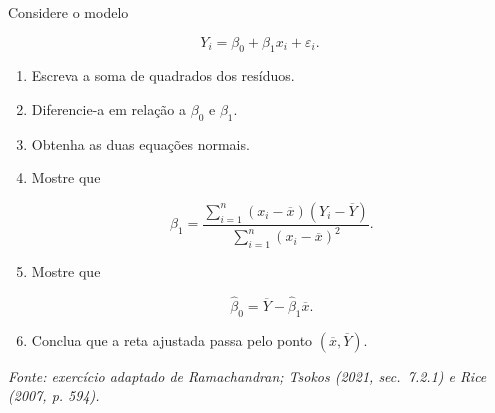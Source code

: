 \documentclass[
  letterpaper,
  DIV=11,
  numbers=noendperiod]{scrreprt}
\begin{document}
\begin{tcolorbox}[enhanced jigsaw, colback=white, leftrule=.75mm, colbacktitle=quarto-callout-tip-color!10!white, breakable, titlerule=0mm, bottomtitle=1mm, title=\textcolor{quarto-callout-tip-color}{\faLightbulb}\hspace{0.5em}{Exercício 1 --- Derivação da reta de mínimos quadrados}, colframe=quarto-callout-tip-color-frame, toprule=.15mm, opacityback=0, bottomrule=.15mm, opacitybacktitle=0.6, arc=.35mm, toptitle=1mm, rightrule=.15mm, coltitle=black, left=2mm]

Considere o modelo

\[Y_i
=
\beta_0+\beta_1x_i+\varepsilon_i.\]

\begin{enumerate}
\def\labelenumi{\arabic{enumi}.}
\item
  Escreva a soma de quadrados dos resíduos.
\item
  Diferencie-a em relação a \(\beta_0\) e \(\beta_1\).
\item
  Obtenha as duas equações normais.
\item
  Mostre que

  \[\widehat\beta_1
  =
  \frac{
  \sum_{i=1}^n
  (x_i-\overline x)(Y_i-\overline Y)
  }{
  \sum_{i=1}^n
  (x_i-\overline x)^2
  }.\]
\item
  Mostre que

  \[\widehat\beta_0
  =
  \overline Y-\widehat\beta_1\overline x.\]
\item
  Conclua que a reta ajustada passa pelo ponto
  \((\overline x,\overline Y)\).
\end{enumerate}

\emph{Fonte: exercício adaptado de Ramachandran; Tsokos (2021,
sec.~7.2.1) e Rice (2007, p. 594).}

\end{tcolorbox}
\end{document}

